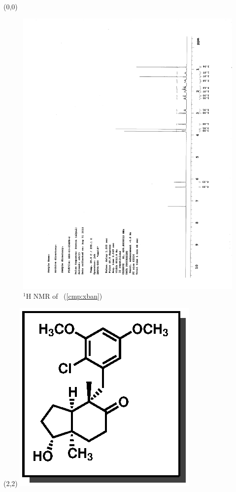\begin{textblock}{20}(0,0)
\begin{figure}[htb]
\caption{$^1$H NMR of \CMPxban\ (\ref{cmp:xban})}
\includegraphics[scale=0.75, trim = 0mm 0mm 0mm 5mm,
clip]{chp_singlecarbon/images/nmr/xbanH}
\vspace{-100pt}
\end{figure}
\end{textblock}
\begin{textblock}{1}(2,2)
\includegraphics[scale=0.8, angle=90]{chp_singlecarbon/images/xban}
\end{textblock}

